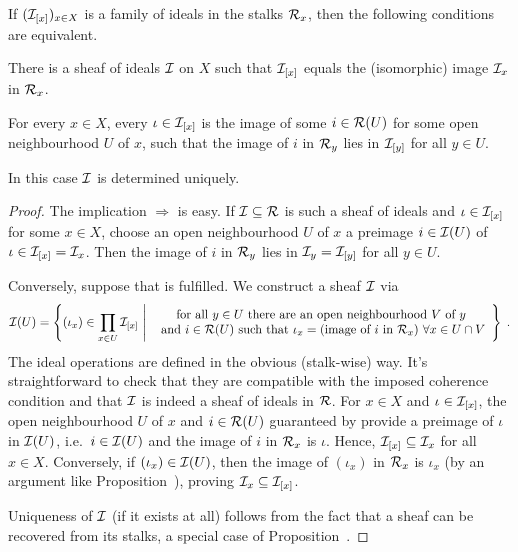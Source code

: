 \documentclass[a4paper,parskip=half,numbers=enddot, DIV=12]{scrreprt}
\begin{document}
\begin{prop}
    If $(\mathcal{I}_{[x]})_{x\in X}$ is a family of ideals in the stalks $\mathcal{R}_x$, then the following conditions are equivalent.
    \begin{alphanumerate}
        \item 
            There is a sheaf of ideals $\mathcal{I}$ on $X$ such that $\mathcal{I}_{[x]}$ equals the (isomorphic) image $\mathcal{I}_x$ in $\mathcal{R}_x$.
        \item  
            For every $x\in X$, every $\iota\in \mathcal{I}_{[x]}$ is the image of some $i\in\mathcal{R}(U)$ for some open neighbourhood $U$ of $x$, such that the image of $i$ in $\mathcal{R}_y$ lies in $\mathcal{I}_{[y]}$ for all $y\in U$.
    \end{alphanumerate}
    In this case $\mathcal{I}$ is determined uniquely.
\end{prop}
	\begin{proof}
		The implication  $\Rightarrow$  is easy. If $\mathcal{I}\subseteq\mathcal{R}$ is such a sheaf of ideals and $\iota\in\mathcal{I}_{[x]}$ for some $x\in X$, choose an open neighbourhood $U$ of $x$ a preimage $i\in\mathcal{I}(U)$ of $\iota\in\mathcal{I}_{[x]}=\mathcal{I}_x$. Then the image of $i$ in $\mathcal{R}_y$ lies in $\mathcal{I}_y=\mathcal{I}_{[y]}$ for all $y\in U$.
		
		Conversely, suppose that  is fulfilled. We construct a sheaf $\mathcal{I}$ via
		\begin{align*}
			\mathcal{I}(U)=\left\{(\iota_x)\in\prod_{x\in U}\mathcal{I}_{[x]}\ \middle|\ 
			\begin{array}{c}
			\text{for all }y\in U\text{ there are an open neighbourhood }V\text{ of }y\\
			\text{ and }i\in\mathcal{R}(U)\text{ such that }\iota_x=(\text{image of }i\text{ in }\mathcal{R}_x)\ \forall x\in U\cap V
			\end{array}\right\}\;.
		\end{align*}
		The ideal operations are defined in the obvious (stalk-wise) way. It's straightforward to check that they are compatible with the imposed coherence condition and that $\mathcal{I}$ is indeed a sheaf of ideals in $\mathcal{R}$. For $x\in X$ and $\iota\in\mathcal{I}_{[x]}$, the open neighbourhood $U$ of $x$ and $i\in\mathcal{R}(U)$ guaranteed by  provide a preimage of $\iota$ in $\mathcal{I}(U)$, i.e.\ $i\in\mathcal{I}(U)$ and the image of $i$ in $\mathcal{R}_x$ is $\iota$. Hence, $\mathcal{I}_{[x]}\subseteq\mathcal{I}_x$ for all $x\in X$. Conversely, if $(\iota_x)\in\mathcal{I}(U)$, then the image of $(\iota_x)$ in $\mathcal{R}_x$ is $\iota_x$ (by an argument like Proposition~), proving $\mathcal{I}_x\subseteq\mathcal{I}_{[x]}$.
		
		Uniqueness of $\mathcal{I}$ (if it exists at all) follows from the fact that a sheaf can be recovered from its stalks, a special case of Proposition~.
	\end{proof}
\end{document}
